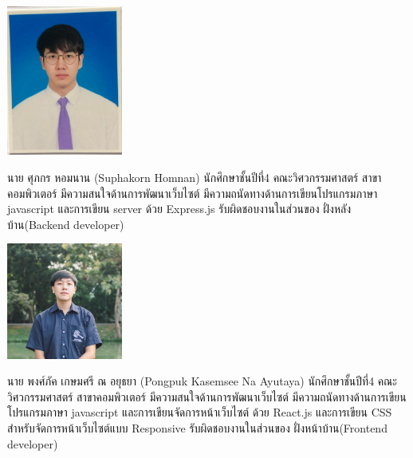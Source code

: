 \documentclass[semifinal]{cpecmu}
\author{นายพงศ์ภัค เกษมศรี ณ อยุธยา}{Pongpuk Kasemsee Na Ayutaya}{600610754}
\author{นายศุภกร หอมนาน}{Suphakorn Homnan}{600610782}
\begin{document}


\pagestyle{empty}\cleardoublepage
\normalspacing \setcounter{page}{1}  \pagestyle{cpecmu}






\ifproject

\fi



\ifproject
\appendix


\ifglossary\glossarypage\fi

\ifindex\indexpage\fi

\begin{biosketch}
\begin{center}
  \includegraphics[width=1.5in]{images/resume_profile.jpeg}
\end{center}
นาย ศุภกร หอมนาน (Suphakorn Homnan) 
นักศึกษาชั้นปีที่4 คณะวิศวกรรมศาสตร์ สาขาคอมพิวเตอร์
มีความสนใจด้านการพัฒนาเว็บไซต์ มีความถนัดทางด้านการเขียนโปรแกรมภาษา javascript และการเขียน server 
ด้วย Express.js 
รับผิดชอบงานในส่วนของ ฝั่งหลังบ้าน(Backend developer)

\begin{center}
  \includegraphics[width=1.5in]{images/bright.jpeg}
\end{center}
นาย พงศ์ภัค เกษมศรี ณ อยุธยา (Pongpuk Kasemsee Na Ayutaya) 
นักศึกษาชั้นปีที่4 คณะวิศวกรรมศาสตร์ สาขาคอมพิวเตอร์
มีความสนใจด้านการพัฒนาเว็บไซต์ มีความถนัดทางด้านการเขียนโปรแกรมภาษา javascript และการเขียนจัดการหน้าเว็บไซต์ 
ด้วย React.js และการเขียน CSS สำหรับจัดการหน้าเว็บไซต์แบบ Responsive
รับผิดชอบงานในส่วนของ ฝั่งหน้าบ้าน(Frontend developer)
\end{biosketch}
\fi %
\end{document}
